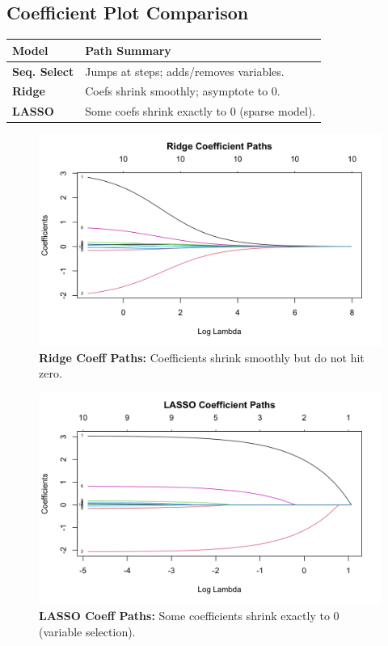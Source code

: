 \documentclass[10pt, landscape]{article}
\begin{document}
\begin{multicols}{3}
\section{Coefficient Plot Comparison}

{\scriptsize
\begin{tabular}{|l|l|}
\hline
\textbf{Model} & \textbf{Path Summary} \\\hline
\textbf{Seq. Select} & Jumps at steps; adds/removes variables. \\\hline
\textbf{Ridge} & Coefs shrink smoothly; asymptote to 0. \\\hline
\textbf{LASSO} & Some coefs shrink exactly to 0 (sparse model). \\\hline
\end{tabular}
}

\vspace{0.5em}
\begin{figure}[H]
\centering
\includegraphics[width=0.95\linewidth]{Ridge coeff path.png}
\vspace{-0.5em}
\caption*{\scriptsize \textbf{Ridge Coeff Paths:} Coefficients shrink smoothly but do not hit zero.}
\end{figure}

\begin{figure}[H]
\centering
\includegraphics[width=0.95\linewidth]{Lasso Coef path.png}
\vspace{-0.5em}
\caption*{\scriptsize \textbf{LASSO Coeff Paths:} Some coefficients shrink exactly to 0 (variable selection).}
\end{figure}


\end{multicols}
\end{document}
